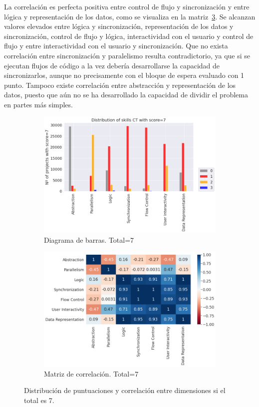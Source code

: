 \documentclass[a4paper, 12pt]{book}
\begin{document}
La correlación es perfecta positiva entre control de flujo y sincronización y entre lógica y representación de los datos, como se visualiza en la matriz~\ref{fig:corr7}. Se alcanzan valores elevados entre lógica y sincronización, representación de los datos y sincronización, control de flujo y lógica, interactividad con el usuario y control de flujo y entre interactividad con el usuario y sincronización. Que no exista correlación entre sincronización y paralelismo resulta contradictorio, ya que si se ejecutan flujos de código a la vez debería desarrollarse la capacidad de sincronizarlos, aunque no precisamente con el bloque de espera evaluado con 1 punto. Tampoco existe correlación entre abstracción y representación de los datos, puesto que aún no se ha desarrollado la capacidad de dividir el problema en partes más simples.

\begin{figure}
    \centering
    \begin{subfigure}[h]{.49\textwidth} 
        \includegraphics[width=\textwidth]{img/distribucion_7_Scratch}
        \caption{Diagrama de barras. Total=7}
        \label{fig:total7}
    \end{subfigure}       
    \begin{subfigure}[h]{.49\textwidth} 
        \includegraphics[width=\textwidth]{img/corr_7_Scratch}
        \caption{Matriz de correlación. Total=7}
        \label{fig:corr7}
    \end{subfigure}
     \caption{Distribución de puntuaciones y correlación entre dimensiones si el total es 7.}
\end{figure}
\end{document}
